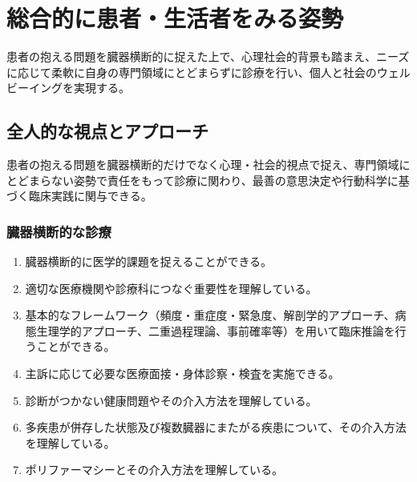 \newpage

\hypertarget{ux7dcfux5408ux7684ux306bux60a3ux8005ux751fux6d3bux8005ux3092ux307fux308bux59ffux52e2}{%
\section{総合的に患者・生活者をみる姿勢}\label{ux7dcfux5408ux7684ux306bux60a3ux8005ux751fux6d3bux8005ux3092ux307fux308bux59ffux52e2}}

患者の抱える問題を臓器横断的に捉えた上で、心理社会的背景も踏まえ、ニーズに応じて柔軟に自身の専門領域にとどまらずに診療を行い、個人と社会のウェルビーイングを実現する。

\hypertarget{ux5168ux4ebaux7684ux306aux8996ux70b9ux3068ux30a2ux30d7ux30edux30fcux30c1}{%
\subsection{全人的な視点とアプローチ}\label{ux5168ux4ebaux7684ux306aux8996ux70b9ux3068ux30a2ux30d7ux30edux30fcux30c1}}

患者の抱える問題を臓器横断的だけでなく心理・社会的視点で捉え、専門領域にとどまらない姿勢で責任をもって診療に関わり、最善の意思決定や行動科学に基づく臨床実践に関与できる。

\hypertarget{ux81d3ux5668ux6a2aux65adux7684ux306aux8a3aux7642}{%
\subsubsection{臓器横断的な診療}\label{ux81d3ux5668ux6a2aux65adux7684ux306aux8a3aux7642}}

\begin{enumerate}
\def\labelenumi{\arabic{enumi}.}
\tightlist
\item
  臓器横断的に医学的課題を捉えることができる。
\item
  適切な医療機関や診療科につなぐ重要性を理解している。
\item
  基本的なフレームワーク（頻度・重症度・緊急度、解剖学的アプローチ、病態生理学的アプローチ、二重過程理論、事前確率等）を用いて臨床推論を行うことができる。
\item
  主訴に応じて必要な医療面接・身体診察・検査を実施できる。
\item
  診断がつかない健康問題やその介入方法を理解している。
\item
  多疾患が併存した状態及び複数臓器にまたがる疾患について、その介入方法を理解している。
\item
  ポリファーマシーとその介入方法を理解している。
\end{enumerate}


